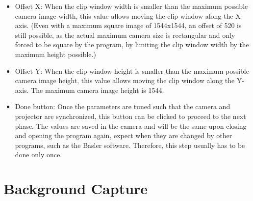 \documentclass[12pt]{article}
\begin{document}
\begin{itemize}
	\item Offset X: When the clip window width is smaller than the maximum possible camera image width, this value allows moving the clip window along the X-axis. (Even with a maximum square image of 1544x1544, an offset of 520 is still possible, as the actual maximum camera size is rectangular and only forced to be square by the program, by limiting the clip window width by the maximum height possible.)
	\item Offset Y: When the clip window height is smaller than the maximum possible camera image height, this value allows moving the clip window along the Y-axis. The maximum camera image height is 1544.
	\item Done button: Once the parameters are tuned such that the camera and projector are synchronized, this button can be clicked to proceed to the next phase. The values are saved in the camera and will be the same upon closing and opening the program again, expect when they are changed by other programs, such as the Basler software. Therefore, this step usually has to be done only once.
\end{itemize}



\section{Background Capture}
\end{document}
